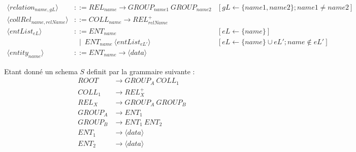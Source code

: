 \begin{landscape}
\begin{adjustbox}{max width=\linewidth,max height=.95\textheight,valign=c}
{\begin{align}
                \langle relation_{name, gL} \rangle          & ::= REL_{name} \to GROUP_{name1} ~ GROUP_{name2}                                                             & [gL \gets \{name1, name2\}; name1 \neq name2]                                                          \\
                \langle collRel_{name,relName} \rangle       & ::= COLL_{name} \to REL_{relName}^+                                                                                                                                                                                   \\[1em]
                \langle entList_{eL} \rangle                 & ::= ENT_{name}                                                                                               & [eL \gets \{name\}]                                                                                    \\
                                                             & ~~ \mid ~ ENT_{name} ~ \langle entList_{eL'} \rangle                                                         & [eL \gets \{name\} \cup eL'; name \notin eL']                                                          \\
                \langle entity_{name} \rangle                & ::= ENT_{name} \to \langle data \rangle
            \end{align}}
    \end{adjustbox}
\end{landscape}


\begin{example}
    Etant donné un schema $S$ definit par la grammaire suivante :
    \begin{align*}
        ROOT & \to GROUP_A ~ COLL_1      \\
        COLL_1 & \to REL_X^+             \\
        REL_X & \to GROUP_A ~ GROUP_B    \\
        GROUP_A & \to ENT_1              \\
        GROUP_B & \to ENT_1 ~ ENT_2      \\
        ENT_1 & \to \langle data \rangle \\
        ENT_2 & \to \langle data \rangle
    \end{align*}
\end{example}

